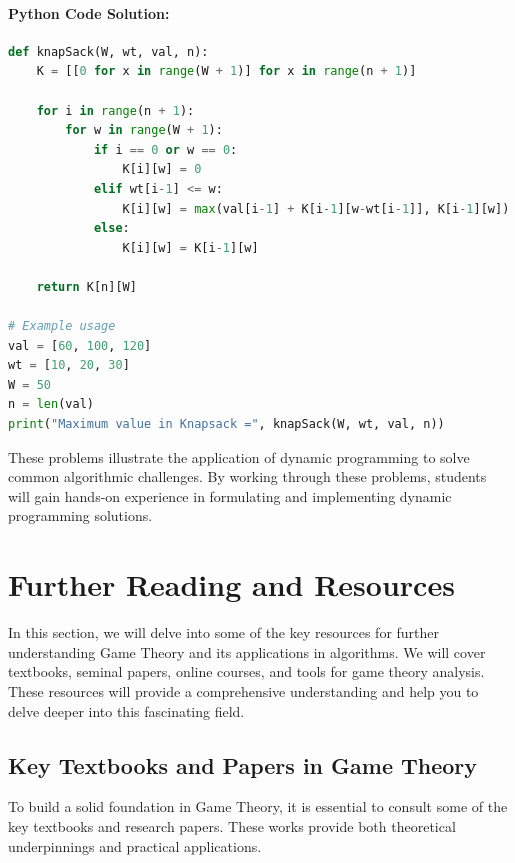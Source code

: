 \documentclass[12pt]{book} %
\begin{document}
\paragraph{Python Code Solution:}
\FloatBarrier
\begin{lstlisting}[language=Python, caption=0-1 Knapsack Problem]
def knapSack(W, wt, val, n):
    K = [[0 for x in range(W + 1)] for x in range(n + 1)]

    for i in range(n + 1):
        for w in range(W + 1):
            if i == 0 or w == 0:
                K[i][w] = 0
            elif wt[i-1] <= w:
                K[i][w] = max(val[i-1] + K[i-1][w-wt[i-1]], K[i-1][w])
            else:
                K[i][w] = K[i-1][w]

    return K[n][W]

# Example usage
val = [60, 100, 120]
wt = [10, 20, 30]
W = 50
n = len(val)
print("Maximum value in Knapsack =", knapSack(W, wt, val, n))
\end{lstlisting}
\FloatBarrier

These problems illustrate the application of dynamic programming to solve common algorithmic challenges. By working through these problems, students will gain hands-on experience in formulating and implementing dynamic programming solutions.


\section{Further Reading and Resources}
In this section, we will delve into some of the key resources for further understanding Game Theory and its applications in algorithms. We will cover textbooks, seminal papers, online courses, and tools for game theory analysis. These resources will provide a comprehensive understanding and help you to delve deeper into this fascinating field.

\subsection{Key Textbooks and Papers in Game Theory}
To build a solid foundation in Game Theory, it is essential to consult some of the key textbooks and research papers. These works provide both theoretical underpinnings and practical applications.
\end{document}
